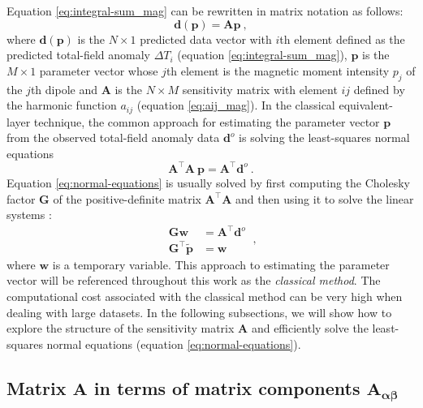 \documentclass[manuscript,noblind]{geophysics}
\begin{document}
Equation \ref{eq:integral-sum_mag} can be rewritten in matrix notation as follows:
\begin{equation}
	\mathbf{d}(\mathbf{p}) = \mathbf{A} \mathbf{p} \: ,
	\label{eq:predicted-data-vector_mag}
\end{equation}
where $\mathbf{d}(\mathbf{p})$ is the $N \times 1$ predicted data vector with $i$th element defined
as the predicted total-field anomaly $\Delta T_{i}$ (equation \ref{eq:integral-sum_mag}),
$\mathbf{p}$ is the $M \times 1$ parameter vector whose $j$th element is the magnetic moment intensity
$p_{j}$ of the $j$th dipole and $\mathbf{A}$ is the $N \times M$ sensitivity matrix with element 
$ij$ defined by the harmonic function $a_{ij}$ (equation \ref{eq:aij_mag}).
In the classical equivalent-layer technique, the common approach for 
estimating the parameter vector $\mathbf{p}$ from the observed 
total-field anomaly data $\mathbf{d}^{o}$ is solving the least-squares normal equations
\begin{equation}
	\mathbf{A}^{\top}\mathbf{A} \: \mathbf{p} = 
	\mathbf{A}^{\top} \mathbf{d}^{o} \: .
	\label{eq:normal-equations}
\end{equation}
Equation \ref{eq:normal-equations} is usually solved by first computing the Cholesky 
factor $\mathbf{G}$ of the positive-definite matrix $\mathbf{A}^{\top}\mathbf{A}$ and then using it to solve the linear 
systems \citep[][ p. 262]{golub-vanloan2013}:
\begin{equation}
	\begin{split}
		\mathbf{G} \mathbf{w} &= \mathbf{A}^{\top}\mathbf{d}^{o} \\
		\mathbf{G}^{\top} \tilde{\mathbf{p}} &= \mathbf{w}
	\end{split} \: ,
	\label{eq:classical-method}
\end{equation}
where $\mathbf{w}$ is a temporary variable.
This approach to estimating the parameter vector will be 
referenced throughout this work as the \textit{classical method}.
The computational cost associated with the classical method can be very high
when dealing with large datasets. In the following subsections, we will show how to 
explore the structure of the sensitivity matrix $\mathbf{A}$ and 
efficiently solve the least-squares normal equations (equation \ref{eq:normal-equations}).


\subsection{Matrix $\mathbf{A}$ in terms of matrix components $\mathbf{A_{\boldsymbol{\alpha\beta}}}$}
\end{document}

